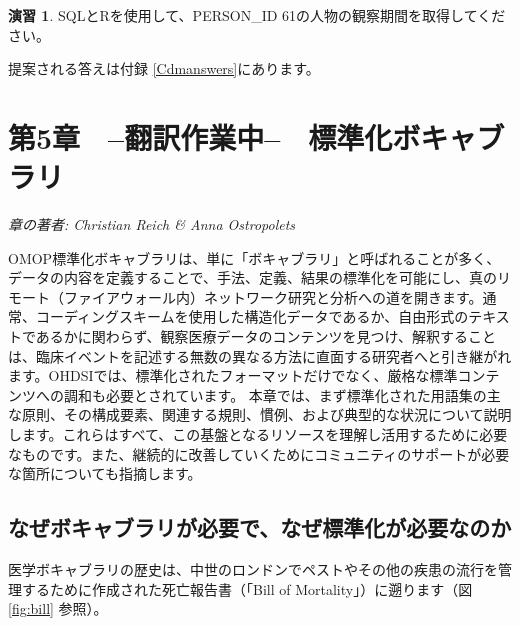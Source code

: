 \documentclass[
  11pt]{book}
\theoremstyle{definition}
\theoremstyle{definition}
\theoremstyle{definition}
\newtheorem{exercise}{演習}[chapter]
\theoremstyle{definition}
\theoremstyle{remark}
\begin{document}
\begin{exercise}
\protect\hypertarget{exr:exercisePerson61Records}{}\label{exr:exercisePerson61Records}SQLとRを使用して、PERSON\_ID 61の人物の観察期間を取得してください。
\end{exercise}

提案される答えは付録 \ref{Cdmanswers}にあります。

\chapter{第5章　--翻訳作業中--　標準化ボキャブラリ}\label{StandardizedVocabularies}


\emph{章の著者: Christian Reich \& Anna Ostropolets}

OMOP標準化ボキャブラリは、単に「ボキャブラリ」と呼ばれることが多く、データの内容を定義することで、手法、定義、結果の標準化を可能にし、真のリモート（ファイアウォール内）ネットワーク研究と分析への道を開きます。通常、コーディングスキームを使用した構造化データであるか、自由形式のテキストであるかに関わらず、観察医療データのコンテンツを見つけ、解釈することは、臨床イベントを記述する無数の異なる方法に直面する研究者へと引き継がれます。OHDSIでは、標準化されたフォーマットだけでなく、厳格な標準コンテンツへの調和も必要とされています。 本章では、まず標準化された用語集の主な原則、その構成要素、関連する規則、慣例、および典型的な状況について説明します。これらはすべて、この基盤となるリソースを理解し活用するために必要なものです。また、継続的に改善していくためにコミュニティのサポートが必要な箇所についても指摘します。

\section{なぜボキャブラリが必要で、なぜ標準化が必要なのか}\label{ux306aux305cux30dcux30adux30e3ux30d6ux30e9ux30eaux304cux5fc5ux8981ux3067ux306aux305cux6a19ux6e96ux5316ux304cux5fc5ux8981ux306aux306eux304b}

医学ボキャブラリの歴史は、中世のロンドンでペストやその他の疾患の流行を管理するために作成された死亡報告書（「Bill of Mortality」）に遡ります（図 \ref{fig:bill} 参照）。
\end{document}
